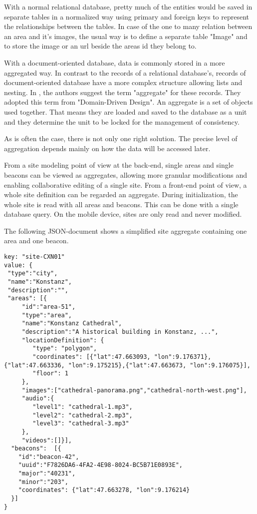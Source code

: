With a normal relational database, pretty much of the entities would be saved in separate tables in a normalized way using primary and foreign keys to represent the relationships between the tables. In case of the one to many relation between an area and it's images, the usual way is to define a separate table "Image" and to store the image or an url beside the areas id they belong to.

With a document-oriented database, data is commonly stored in a more aggregated way. In contrast to the records of a relational database's, records of document-oriented database have a more complex structure allowing lists and nesting. In \cite{nosqldistilled}, the authors suggest the term "aggregate" for these records. They adopted this term from \cite{domaindriven} "Domain-Driven Design". An aggregate is a set of objects used together. That means they are loaded and saved to the database as a unit and they determine the unit to be locked for the management of consistency.  

As is often the case, there is not only one right solution. The precise level of aggregation depends mainly on how the data will be accessed later. 

From a site modeling point of view at the back-end, single areas and single beacons can be viewed as aggregates, allowing more granular modifications and enabling collaborative editing of a single site.
From a front-end point of view, a whole site definition can be regarded an aggregate. During initialization, the whole site is read with all areas and beacons. This can be done with a single database query. On the mobile device, sites are only read and never modified.
 

The following JSON-document shows a simplified site aggregate containing one area and one beacon.

\begin{lstlisting}
key: "site-CXN01"
value: {
 "type":"city",
 "name":"Konstanz",
 "description":"",
 "areas": [{
     "id":"area-51",
     "type":"area",
	 "name":"Konstanz Cathedral", 
	 "description":"A historical building in Konstanz, ...",
	 "locationDefinition": {
	 	"type": "polygon",
	 	"coordinates": [{"lat":47.663093, "lon":9.176371},{"lat":47.663336, "lon":9.175215},{"lat":47.663673, "lon":9.176075}],
	 	"floor": 1
	 }, 
	 "images":["cathedral-panorama.png","cathedral-north-west.png"], 
	 "audio":{
	 	"level1": "cathedral-1.mp3",
	 	"level2": "cathedral-2.mp3",
	 	"level3": "cathedral-3.mp3"
	 }, 
	 "videos":[]}],
  "beacons":  [{
  	"id":"beacon-42",
  	"uuid":"F7826DA6-4FA2-4E98-8024-BC5B71E0893E",
  	"major":"40231",
  	"minor":"203",
  	"coordinates": {"lat":47.663278, "lon":9.176214}
  }]
}
\end{lstlisting}

